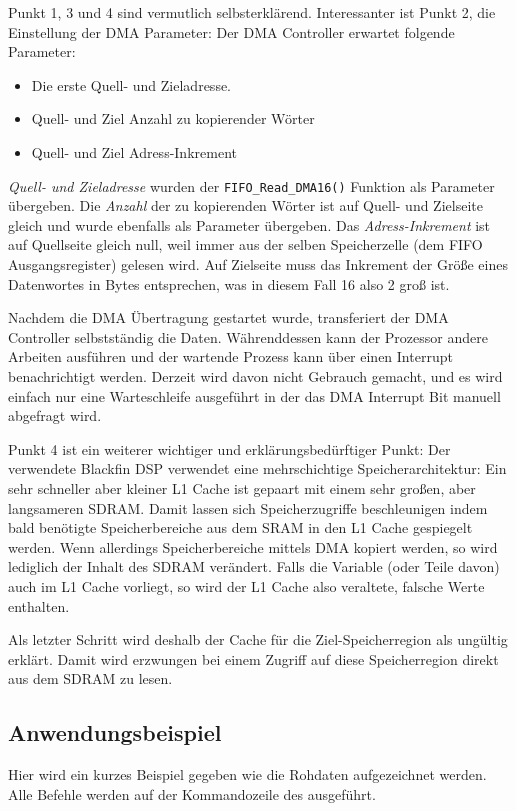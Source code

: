 Punkt 1, 3 und 4 sind vermutlich selbsterklärend. Interessanter ist Punkt 2, die Einstellung der DMA Parameter: Der DMA Controller erwartet folgende Parameter: 
\begin{itemize}
    \item Die erste Quell- und Zieladresse.
    \item Quell- und Ziel Anzahl zu kopierender Wörter
    \item Quell- und Ziel Adress-Inkrement
\end{itemize}

\emph{Quell- und Zieladresse} wurden der \lstinline$FIFO_Read_DMA16()$ Funktion als Parameter übergeben. Die \emph{Anzahl} der zu kopierenden Wörter ist auf Quell- und Zielseite gleich und wurde ebenfalls als Parameter übergeben. Das \emph{Adress-Inkrement} ist auf Quellseite gleich null, weil immer aus der selben Speicherzelle (dem FIFO Ausgangsregister) gelesen wird. Auf Zielseite muss das Inkrement der Größe eines Datenwortes in Bytes entsprechen, was in diesem Fall \SI{16}{\bit} also \SI{2}{\byte} groß ist.

Nachdem die DMA Übertragung gestartet wurde, transferiert der DMA Controller selbstständig die Daten. Währenddessen kann der Prozessor andere Arbeiten ausführen und der wartende Prozess kann über einen Interrupt benachrichtigt werden. Derzeit wird davon nicht Gebrauch gemacht, und es wird einfach nur eine Warteschleife ausgeführt in der das DMA Interrupt Bit manuell abgefragt wird.

Punkt 4 ist ein weiterer wichtiger und erklärungsbedürftiger Punkt: Der verwendete Blackfin DSP verwendet eine mehrschichtige Speicherarchitektur: Ein sehr schneller aber kleiner L1 Cache ist gepaart mit einem sehr großen, aber langsameren SDRAM. Damit lassen sich Speicherzugriffe beschleunigen indem bald benötigte Speicherbereiche aus dem SRAM in den L1 Cache gespiegelt werden. Wenn allerdings Speicherbereiche mittels DMA kopiert werden, so wird lediglich der Inhalt des SDRAM verändert. Falls die Variable (oder Teile davon) auch im L1 Cache vorliegt, so wird der L1 Cache also veraltete, falsche Werte enthalten.

Als letzter Schritt wird deshalb der Cache für die Ziel-Speicherregion als ungültig erklärt. Damit wird erzwungen bei einem Zugriff auf diese Speicherregion direkt aus dem SDRAM zu lesen.


\subsection{Anwendungsbeispiel}\label{BeispielRohdatenAufzeichnen}
Hier wird ein kurzes Beispiel gegeben wie die Rohdaten aufgezeichnet werden. Alle Befehle werden auf der Kommandozeile des \comboard ausgeführt.

